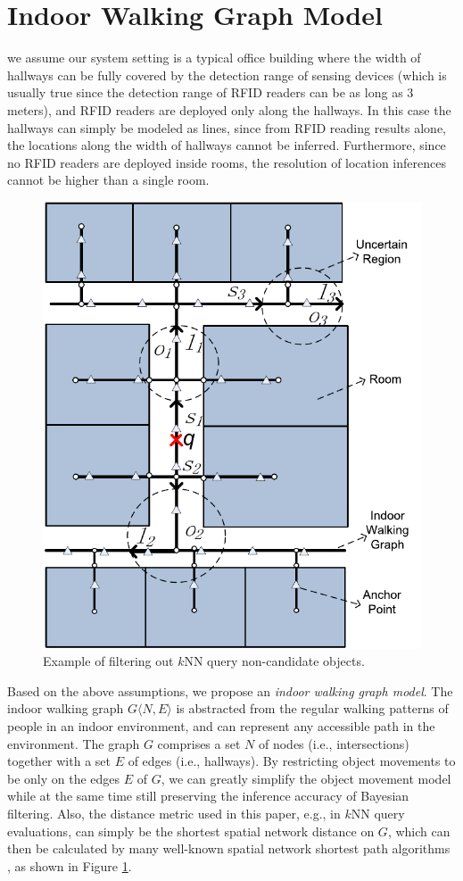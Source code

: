 \documentclass[12pt]{report}
\begin{document}
\section{Indoor Walking Graph Model}
\label{sec:org1b9f4d5}

we assume our system setting is a typical office building where
the width of hallways can be fully covered by the detection range
of sensing devices (which is usually true since the detection
range of RFID readers can be as long as 3 meters), and RFID
readers are deployed only along the hallways.  In this case the
hallways can simply be modeled as lines, since from RFID reading
results alone, the locations along the width of hallways cannot be
inferred.  Furthermore, since no RFID readers are deployed inside
rooms, the resolution of location inferences cannot be higher than
a single room.

\begin{figure}[htbp]
\centering
\includegraphics[width=.5\textwidth]{img/knn-filter-non-candidates.pdf}
\caption{\label{fig:knn-filter-non-candidates}
Example of filtering out \(k\)NN query non-candidate objects.}
\end{figure}

Based on the above assumptions, we propose an \emph{indoor walking
graph model}.  The indoor walking graph \(G\langle N, E\rangle\)
is abstracted from the regular walking patterns of people in an
indoor environment, and can represent any accessible path in the
environment.  The graph \(G\) comprises a set \(N\) of nodes
(i.e., intersections) together with a set \(E\) of edges (i.e.,
hallways).  By restricting object movements to be only on the
edges \(E\) of \(G\), we can greatly simplify the object movement
model while at the same time still preserving the inference
accuracy of Bayesian filtering.  Also, the distance metric used in
this paper, e.g., in \(k\)NN query evaluations, can simply be the
shortest spatial network distance on \(G\), which can then be
calculated by many well-known spatial network shortest path
algorithms \cite{papadias2003-query,samet2008-scalable}, as shown in
Figure \ref{fig:knn-filter-non-candidates}.
\end{document}
